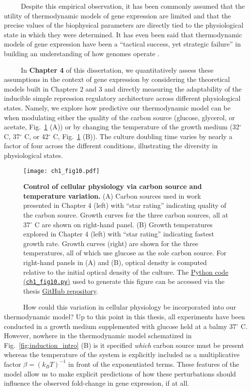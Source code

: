 \documentclass[12pt]{caltech_thesis}
\begin{document}
~~~~~Despite this empirical observation, it has been commonly assumed
that the utility of thermodynamic models of gene expression are limited
and that the precise values of the biophysical parameters are directly
tied to the physiological state in which they were determined. It has
even been said that thermodynamic models of gene expression have been a
``tactical success, yet strategic failure'' in building an understanding
of how genomes operate \autocite{phillips2019}.

~~~~~In \textbf{Chapter 4} of this dissertation, we quantitatively
assess these assumptions in the context of gene expression by
considering the theoretical models built in Chapters 2 and 3 and
directly measuring the adaptability of the inducible simple repression
regulatory architecture across different physiological states. Namely,
we explore how predictive our thermodynamic model can be when modulating
either the quality of the carbon source (glucose, glycerol, or acetate,
Fig.~\ref{fig:growth_intro} (A)) or by changing the temperature of the
growth medium (32\(^\circ\) C, 37\(^\circ\) C, or 42\(^\circ\) C,
Fig.~\ref{fig:growth_intro} (B)). The culture doubling time varies by
nearly a factor of four across the different conditions, illustrating
the diversity in physiological states.

\hypertarget{fig:growth_intro}{%
\begin{figure}
\centering
\texttt{[image: ch1\_fig10.pdf]}
\caption[{Methods of physiological control used in Chapter
4.}]{\textbf{Control of cellular physiology via carbon source and
temperature variation.} (A) Carbon sources used in work presented in
Chapter 4 (left) with ``star rating'' indicating quality of the carbon
source. Growth curves for the three carbon sources, all at 37\(^\circ\)
C are shown on right-hand panel. (B) Growth temperatures explored in
Chapter 4 (left) with ``star rating'' indicating fastest growth rate.
Growth curves (right) are shown for the three temperatures, all of which
use glucose as the sole carbon source. For right-hand panels in (A) and
(B), optical density is computed relative to the initial optical density
of the culture. The
\href{https://github.com/gchure/phd/blob/master/src/chapter_01/code/ch1_fig10.py}{Python
code (\texttt{ch1\_fig10.py})} used to generate this figure can be
accessed via the thesis \href{https://github.com/gchure/phd}{GitHub
repository}.}
\label{fig:growth_intro}
\end{figure}
}

~~~~~ How could this variation in cellular physiology be incorporated
into our thermodynamic model? Up to this point in this thesis, all
experiments have been conducted in a growth medium supplemented with
glucose held at a balmy 37\(^\circ\) C. However, nowhere in the
thermodynamic model schematized in Fig.~\ref{fig:induction_intro} (B) is
it specified \emph{which} carbon source must be present whereas the
temperature of the system is explicitly included as a multiplicative
factor \(\beta = \left(k_BT\right)^{-1}\) in front of the exponentiated
terms. These features of the model allow us to make explicit predictions
of how these perturbations should influence the observed fold-change in
gene expression, if at all.
\end{document}
